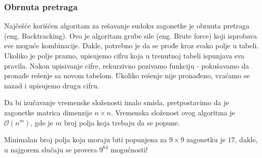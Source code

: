 \documentclass[a4paper]{article}
\begin{document}
    \subsubsection{Obrnuta pretraga}
    Najčešće korišćen algoritam za rešavanje sudoku zagonetke je obrnuta pretraga (eng. Backtracking).
    Ovo je algoritam grube sile (eng. Brute force) koji isprobava sve moguće kombinacije. Dakle, potrebno je da se prođe kroz
    svako polje u tabeli. Ukoliko je polje prazno, upisujemo cifru koja u trenutnoj tabeli ispunjava sva pravila. Nakon upisivanje cifre, rekurzivno pozivamo funkciju 
    - pokušavamo da pronađe rešenje sa novom tabelom. Ukoliko rešenje nije pronađeno, vraćamo se nazad i upisujemo drugu cifru. 
    \par Da bi izučavanje vremenske složenosti imalo smisla, pretpostavimo da je zagonetke matrica dimenzije $n\times n$. Vremenska složenost ovog algoritma je 
    $\mathcal{O}(n ^ m)$, gde je $m$ broj polja koja trebaju da se popune. 
    \par Minimalan broj polja koja moraju biti popunjena za $9\times9$ zagonetku je $17$, dakle, u najgorem slučaju se provera $9^{64}$ mogućnosti!
    
\end{document}
